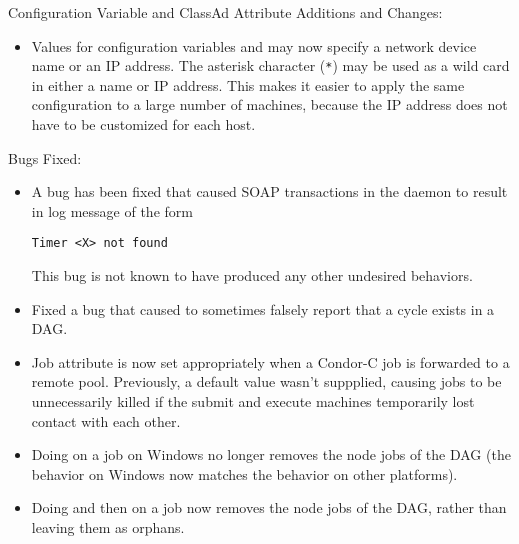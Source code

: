 \noindent Configuration Variable and ClassAd Attribute Additions and Changes:

\begin{itemize}

\item Values for configuration variables  and
   may now specify a network
  device name or an IP address.  The asterisk character (\verb|*|)
  may be used as a wild card in either a name or IP address.
  This makes it easier to apply the same
  configuration to a large number of machines, because the IP address
  does not have to be customized for each host.

\end{itemize}

\noindent Bugs Fixed:

\begin{itemize}

\item A bug has been fixed that caused SOAP transactions in the
   daemon to result in log message of the form 
\begin{verbatim}
Timer <X> not found
\end{verbatim}
  This bug is not known to have produced any other
  undesired behaviors.

\item Fixed a bug that caused  to sometimes falsely
report that a cycle exists in a DAG.

\item Job attribute  is now set appropriately
when a Condor-C job is forwarded to a remote pool. Previously, a default
value wasn't suppplied, causing jobs to be unnecessarily killed if the
submit and execute machines temporarily lost contact with each other.

\item Doing  on a  job on Windows no longer
removes the node jobs of the DAG (the behavior on Windows now matches
the behavior on other platforms).

\item Doing  and then  on a 
job now removes the node jobs of the DAG, rather than leaving them
as orphans.

\end{itemize}


